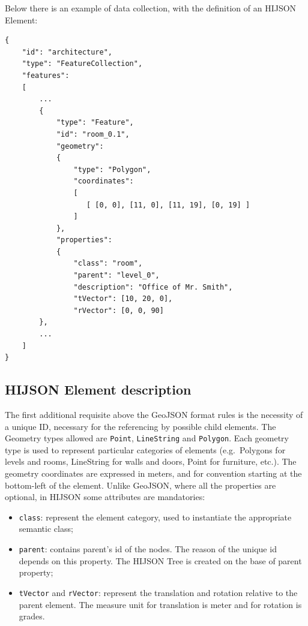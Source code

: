 \documentclass{sig-alternate}
\begin{document}
Below there is an example of data collection, with the definition of an HIJSON Element:

\begin{verbatim}
{
    "id": "architecture",
    "type": "FeatureCollection",
    "features": 
    [
        ...
        {
            "type": "Feature",
            "id": "room_0.1",
            "geometry": 
            {
                "type": "Polygon",
                "coordinates": 
                [ 
                   [ [0, 0], [11, 0], [11, 19], [0, 19] ]
                ]    
            },
            "properties": 
            {
                "class": "room",
                "parent": "level_0",
                "description": "Office of Mr. Smith",
                "tVector": [10, 20, 0],
                "rVector": [0, 0, 90]
        },
        ...
    ]
}
\end{verbatim}

\subsection{HIJSON Element description}

The first additional requisite above the GeoJSON format rules is the
necessity of a unique ID, necessary for the referencing by possible
child elements. The Geometry types allowed are \texttt{Point},
\texttt{LineString} and \texttt{Polygon}. Each geometry type is used to
represent particular categories of elements (e.g.~Polygons for levels
and rooms, LineString for walls and doors, Point for furniture, etc.).
The geometry coordinates are expressed in meters, and for convention
starting at the bottom-left of the element. Unlike GeoJSON, where all
the properties are optional, in HIJSON some attributes are mandatories:

\begin{itemize}
\itemsep1pt\parskip0pt
\item
  \texttt{class}: represent the element category, used to instantiate
  the appropriate semantic class;
\item
  \texttt{parent}: contains parent's id of the nodes. The reason of the
  unique id depends on this property. The HIJSON Tree is created on the
  base of parent property;
\item
  \texttt{tVector} and \texttt{rVector}: represent the translation and
  rotation relative to the parent element. The measure unit for
  translation is meter and for rotation is grades.
\end{itemize}
\end{document}

